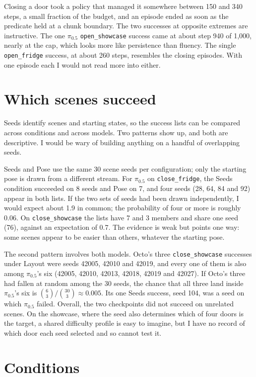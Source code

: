 Closing a door took a policy that managed it somewhere between 150 and 340 steps, a small fraction of the budget, and an episode ended as soon as the predicate held at a chunk boundary. The two successes at opposite extremes are instructive. The one $\pi_{0.5}$ \texttt{open\_showcase} success came at about step 940 of 1,000, nearly at the cap, which looks more like persistence than fluency. The single \texttt{open\_fridge} success, at about 260 steps, resembles the closing episodes. With one episode each I would not read more into either.

\section{Which scenes succeed}
\label{sec:which-scenes}

Seeds identify scenes and starting states, so the success lists can be compared across conditions and across models. Two patterns show up, and both are descriptive. I would be wary of building anything on a handful of overlapping seeds.

Seeds and Pose use the same 30 scene seeds per configuration; only the starting pose is drawn from a different stream. For $\pi_{0.5}$ on \texttt{close\_fridge}, the Seeds condition succeeded on 8 seeds and Pose on 7, and four seeds (28, 64, 84 and 92) appear in both lists. If the two sets of seeds had been drawn independently, I would expect about 1.9 in common; the probability of four or more is roughly 0.06. On \texttt{close\_showcase} the lists have 7 and 3 members and share one seed (76), against an expectation of 0.7. The evidence is weak but points one way: some scenes appear to be easier than others, whatever the starting pose.

The second pattern involves both models. Octo's three \texttt{close\_showcase} successes under Layout were seeds 42005, 42010 and 42019, and every one of them is also among $\pi_{0.5}$'s six (42005, 42010, 42013, 42018, 42019 and 42027). If Octo's three had fallen at random among the 30 seeds, the chance that all three land inside $\pi_{0.5}$'s six is $\binom{6}{3}/\binom{30}{3}\approx0.005$. Its one Seeds success, seed 104, was a seed on which $\pi_{0.5}$ failed. Overall, the two checkpoints did not succeed on unrelated scenes. On the showcase, where the seed also determines which of four doors is the target, a shared difficulty profile is easy to imagine, but I have no record of which door each seed selected and so cannot test it.

\section{Conditions}
\label{sec:conditions}


